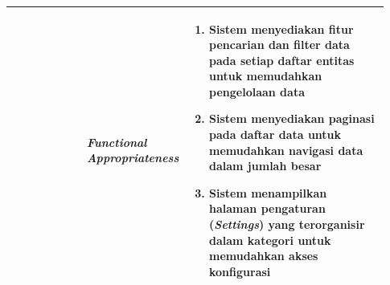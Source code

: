 \begin{longtable}{|p{0.2\linewidth}|p{0.2\linewidth}|p{0.53\linewidth}|}
                                                                  & \textbf{\textit{Functional Appropriateness}}                                                                                                            & \begin{enumerate}[before=\vspace{-8pt}, leftmargin=*, nosep, series=FSA] \item Sistem menyediakan fitur pencarian dan filter data pada setiap daftar entitas untuk memudahkan pengelolaan data \item Sistem menyediakan paginasi pada daftar data untuk memudahkan navigasi data dalam jumlah besar \item Sistem menampilkan halaman pengaturan (\textit{Settings}) yang terorganisir dalam kategori untuk memudahkan akses konfigurasi \end{enumerate}                                                                                                                                                                                                                                                                                                                                                                                                                                                                                                                                                                                                                                                                                                                                                                                                                                                                                                                                                                      \\
      \hline


\end{longtable}
